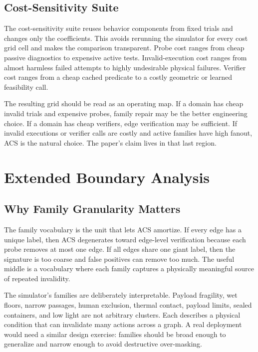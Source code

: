 \documentclass{article}
\newcommand{\ACS}{\textsc{ACS}}
\begin{document}
\subsection{Cost-Sensitivity Suite}

The cost-sensitivity suite reuses behavior components from fixed trials and changes only the coefficients. This avoids rerunning the simulator for every cost grid cell and makes the comparison transparent. Probe cost ranges from cheap passive diagnostics to expensive active tests. Invalid-execution cost ranges from almost harmless failed attempts to highly undesirable physical failures. Verifier cost ranges from a cheap cached predicate to a costly geometric or learned feasibility call.

The resulting grid should be read as an operating map. If a domain has cheap invalid trials and expensive probes, family repair may be the better engineering choice. If a domain has cheap verifiers, edge verification may be sufficient. If invalid executions or verifier calls are costly and active families have high fanout, \ACS{} is the natural choice. The paper's claim lives in that last region.

\section{Extended Boundary Analysis}

\subsection{Why Family Granularity Matters}

The family vocabulary is the unit that lets \ACS{} amortize. If every edge has a unique label, then \ACS{} degenerates toward edge-level verification because each probe removes at most one edge. If all edges share one giant label, then the signature is too coarse and false positives can remove too much. The useful middle is a vocabulary where each family captures a physically meaningful source of repeated invalidity.

The simulator's families are deliberately interpretable. Payload fragility, wet floors, narrow passages, human exclusion, thermal contact, payload limits, sealed containers, and low light are not arbitrary clusters. Each describes a physical condition that can invalidate many actions across a graph. A real deployment would need a similar design exercise: families should be broad enough to generalize and narrow enough to avoid destructive over-masking.
\end{document}
